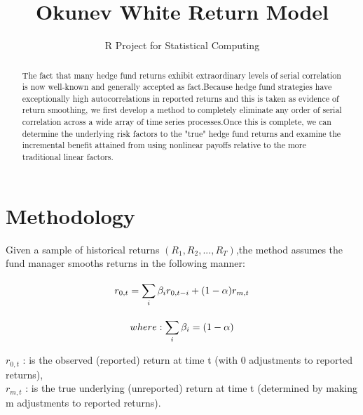 \documentclass[12pt,letterpaper,english]{article}
\title{Okunev White Return Model}
\author{R Project for Statistical Computing}
\begin{document}


\maketitle


\begin{abstract}
The fact that many hedge fund returns exhibit extraordinary levels of serial correlation is now well-known and generally accepted as fact.Because hedge fund strategies have exceptionally high autocorrelations in reported returns and this is taken as evidence of return smoothing, we first develop a method to completely eliminate any order of serial correlation across a wide array of time series processes.Once this is complete, we can determine the underlying risk factors to the "true" hedge fund returns and examine the incremental benefit attained from using nonlinear payoffs relative to the more traditional linear factors.
\end{abstract}



\section{Methodology}
Given a sample of historical returns \((R_1,R_2, . . .,R_T)\),the method assumes the fund manager smooths returns in the following manner:

  
\begin{equation}
 r_{0,t}  =  \sum_{i}^{} \beta_{i}r_{0,t-i} + (1- \alpha)r_{m,t} \\
\end{equation}


\begin{equation}
where :  \sum_{i}^{} \beta_{i} = (1- \alpha) \\
\end{equation}

\(r_{0,t}\) : is the observed (reported) return at time t (with 0 adjustments to reported returns), \\
\(r_{m,t}\) : is the true underlying (unreported) return at time t (determined by making m adjustments to reported returns). \\
\end{document}
